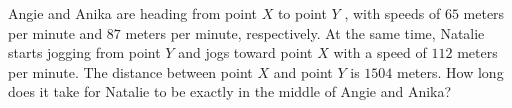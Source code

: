 Angie and Anika are heading from point $X$ to point $Y$ , with speeds of $65$ meters per minute and $87$ meters per minute, respectively. At the same time, Natalie starts jogging from point $Y$ and jogs toward point $X$ with a speed of $112$ meters per minute. The distance between point $X$ and point $Y$ is $1504$ meters. How long does it take for Natalie to be exactly in the middle of Angie and Anika?

